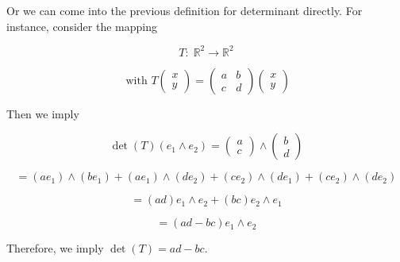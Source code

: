 \documentclass[11pt]{article}
\begin{document}
Or we can come into the previous definition for determinant directly. For instance, consider the mapping

\[
T : \;{\mathbb{R}}^2 \rightarrow  {\mathbb{R}}^2
\]

\[
\text{ with }T\left( \begin{array}{l} x \\  y \end{array}\right)  = \left( \begin{array}{ll} a & b \\  c & d \end{array}\right) \left( \begin{array}{l} x \\  y \end{array}\right)
\]

Then we imply

\[
\det \left( T\right) \left( {{e}_1 \land  {e}_2}\right)  = \left( \begin{array}{l} a \\  c \end{array}\right)  \land  \left( \begin{array}{l} b \\  d \end{array}\right)
\]

\[
= \left( {a{e}_1}\right)  \land  \left( {b{e}_1}\right)  + \left( {a{e}_1}\right)  \land  \left( {d{e}_2}\right)  + \left( {c{e}_2}\right)  \land  \left( {d{e}_1}\right)  + \left( {c{e}_2}\right)  \land  \left( {d{e}_2}\right)
\]

\[
= \left( {ad}\right) {e}_1 \land  {e}_2 + \left( {bc}\right) {e}_2 \land  {e}_1
\]

\[
= \left( {{ad} - {bc}}\right) {e}_1 \land  {e}_2
\]

Therefore, we imply \(\det \left( T\right)  = {ad} - {bc}\).
\end{document}
